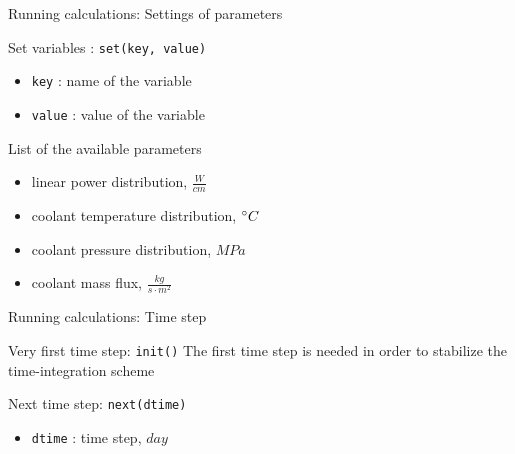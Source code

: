 \documentclass[11pt]{beamer}
\begin{document}
\begin{frame}{Running calculations: Settings of parameters}
  
  \footnotesize

  \begin{block}{Set variables : \texttt{set(key, value)}}
    \begin{itemize}
    \item \texttt{key} : name of the variable
    \item \texttt{value} : value of the variable    
    \end{itemize}
  \end{block}

  \begin{block}{List of the available parameters}
    \begin{itemize}
    \item linear power distribution, $\frac{W}{cm}$
    \item coolant temperature distribution, $\degree C$
    \item coolant pressure distribution, $MPa$
    \item coolant mass flux, $\frac{kg}{s \cdot m^2}$
    \end{itemize}
  \end{block}

\end{frame}



\begin{frame}{Running calculations: Time step}
  
  \footnotesize

  \begin{block}{Very first time step: \texttt{init()}}
  The first time step is needed in order to stabilize the time-integration scheme
  \end{block}

  \begin{block}{Next time step: \texttt{next(dtime)}}
    \begin{itemize}
    \item \texttt{dtime} : time step, $day$
    \end{itemize}
  \end{block}

\end{frame}
\end{document}
